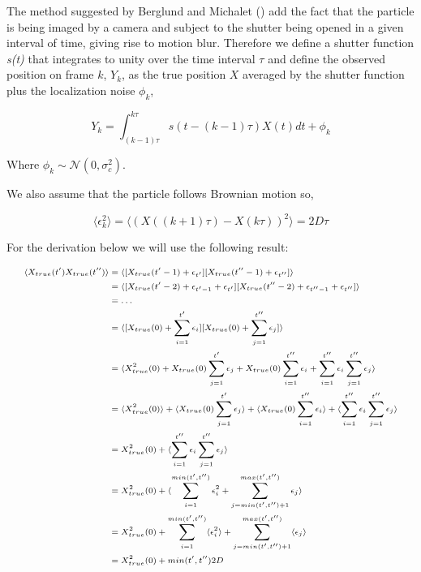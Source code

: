 \documentclass[ba]{imsart}\usepackage[]{graphicx}\usepackage[]{xcolor}
\numberwithin{equation}{section}
\theoremstyle{plain}
\begin{document}
\begin{supplement}

The method suggested by Berglund and Michalet (\cite{RN44, BerglundMichalet2012}) add the fact that the particle is being imaged by a camera and subject to the shutter being opened in a given interval of time, giving rise to motion blur. Therefore we define a shutter function \emph{s(t)} that integrates to unity over the time interval $\tau$ and define the observed position on frame $k$, $Y_k$, as the true position $X$ averaged by the shutter function plus the localization noise $\phi_k$,

$$
Y_k = \int_{(k-1)\tau}^{k\tau} s(t-(k-1)\tau)X(t)dt + \phi_k
$$

Where $\phi_k \sim \mathcal{N}(0,\sigma^2_c)$.

We also assume that the particle follows Brownian motion so,

$$
  \langle \epsilon_k^2 \rangle = \langle (X((k+1)\tau)-X(k\tau))^2 \rangle = 2D\tau
$$

For the derivation below we will use the following result:

\begin{equation} \label{eq:auxResult}
\scriptsize
\begin{aligned}
\langle X_{true}(t')X_{true}(t'')\rangle &= \langle [X_{true}(t'-1)+\epsilon_{t'}][X_{true}(t''-1)+\epsilon_{t''}]\rangle \\
&= \langle [X_{true}(t'-2)+\epsilon_{t'-1}+\epsilon_{t'}][X_{true}(t''-2)+\epsilon_{t''-1}+\epsilon_{t''}]\rangle \\
&=\ldots \\
&= \langle [X_{true}(0)+\sum_{i=1}^{t'} \epsilon_{i}][X_{true}(0)+\sum_{j=1}^{t''} \epsilon_{j}]\rangle \\
&= \langle X_{true}^2(0)+X_{true}(0) \sum_{j=1}^{t'} \epsilon_{j}+X_{true}(0)\sum_{i=1}^{t''} \epsilon_{i} +\sum_{i=1}^{t''} \epsilon_{i}\sum_{j=1}^{t''} \epsilon_{j} \rangle\\
&= \langle X_{true}^2(0)\rangle+\langle X_{true}(0) \sum_{j=1}^{t'} \epsilon_{j}\rangle+\langle X_{true}(0)\sum_{i=1}^{t''} \epsilon_{i} \rangle+\langle \sum_{i=1}^{t''} \epsilon_{i}\sum_{j=1}^{t''} \epsilon_{j} \rangle\\
&= X_{true}^2(0)+\langle \sum_{i=1}^{t''} \epsilon_{i}\sum_{j=1}^{t''} \epsilon_{j} \rangle\\
&= X_{true}^2(0)+\langle \sum_{i=1}^{min(t',t'')} \epsilon_{i}^2+\sum_{j=min(t',t'')+1}^{max(t',t'')} \epsilon_{j} \rangle\\
&= X_{true}^2(0)+\sum_{i=1}^{min(t',t'')} \langle \epsilon_{i}^2 \rangle+\sum_{j=min(t',t'')+1}^{max(t',t'')} \langle \epsilon_{j} \rangle\\
&= X_{true}^2(0)+min(t',t'') 2 D\\
\end{aligned}
\end{equation}



\end{supplement}
\end{document}
